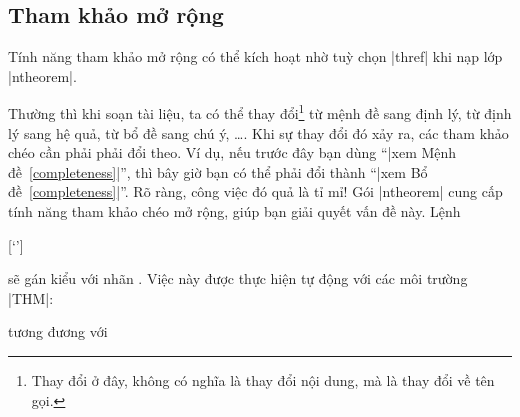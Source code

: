 \begin{theorem}
\begin{thm}
\subsection{\texorpdfstring{Tham khảo mở rộng}{Tham khao mo rong}}

Tính năng tham khảo mở rộng có thể kích hoạt nhờ tuỳ chọn
|thref| khi nạp lớp |ntheorem|.

\medskip
Thường thì khi soạn tài liệu, ta có thể thay đổi\footnote{Thay đổi ở đây,
không có nghĩa là thay đổi nội dung, mà là thay đổi về tên gọi.}
từ mệnh đề
sang định lý, từ định lý sang hệ quả, từ bổ đề sang chú ý,
\ldots. Khi sự thay đổi đó xảy ra, các tham khảo chéo cần phải
phải đổi theo. Ví dụ, nếu trước đây bạn dùng 
``|xem Mệnh đề~\ref{completeness}|'', thì bây giờ bạn có thể phải đổi
thành ``|xem Bổ đề~\ref{completeness}|''. Rõ ràng, công việc đó
quả là tỉ mỉ! Gói |ntheorem| cung cấp tính năng
tham khảo chéo mở rộng, giúp bạn giải quyết vấn đề này.
Lệnh
\begin{command}
  \label{`\meta{label}'}[`']
\end{command}
sẽ gán kiểu  với nhãn .
Việc này được thực hiện tự động với các môi trường |THM|:
tương đương với


\end{thm}
\end{theorem}
